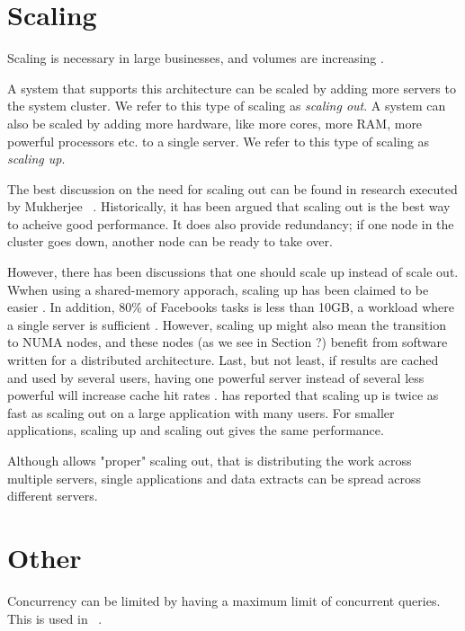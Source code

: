 \section{Scaling}
\label{sec:Scaling}
Scaling is necessary in large businesses, and volumes are increasing \cite{Qlik2012-ku}.

A system that supports this architecture can be scaled by adding more servers to the system cluster. We refer to this type of scaling as \textit{scaling out}. A system can also be scaled by adding more hardware, like more cores, more RAM, more powerful processors etc. to a single server. We refer to this type of scaling as \textit{scaling up}.

The best discussion on the need for scaling out can be found in research executed by Mukherjee \ea~\cite{Mukherjee2015-ul}. Historically, it has been argued that scaling out is the best way to acheive good performance. It does also provide redundancy; if one node in the cluster goes down, another node can be ready to take over.

However, there has been discussions that one should scale up instead of scale out. Wwhen using a shared-memory apporach, scaling up has been claimed to be easier \cite{Boncz2002-yj}. In addition, 80\% of Facebooks tasks is less than 10GB, a workload where a single server is sufficient \cite{Mukherjee2015-ul}. However, scaling up might also mean the transition to NUMA nodes, and these nodes (as we see in Section ?) benefit from software written for a distributed architecture. Last, but not least, if results are cached and used by several users, having one powerful server instead of several less powerful will increase cache hit rates \cite{qlik2012-ku}. \qlikview has reported that scaling up is twice as fast as scaling out on a large application with many users. For smaller applications, scaling up and scaling out gives the same performance.

Although \qlikview \cite{Qlik2012-ku} allows "proper" scaling out, that is distributing the work across multiple servers, single applications and data extracts can be spread across different servers. 



\section{Other}
\label{sec:Other}
Concurrency can be limited by having a maximum limit of concurrent queries. This is used in \ibm~\cite{Raman2013-em}.

